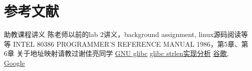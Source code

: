 \documentclass[11pt,a4paper]{article}
\begin{document}
\section{参考文献}
\begin{thebibliography}{10}
 助教课程讲义
 陈老师以前的lab 2讲义，background assignment, linux源码阅读等等
 INTEL 80386 PROGRAMMER'S REFERENCE MANUAL 1986，第5章、第6章
 关于地址映射请教过谢佳亮同学
 \href{http://man.chinaunix.net/linux/lfs/htmlbook/appendixa/glibc.html}{GNU glibc}
 \href{http://bigwhite.blogbus.com/logs/37753065.html}{glibc strlen实现分析}
 \href{http://g.cn}{谷歌}, \href{http://www.google.com/ncr}{Google}
\end{thebibliography}
\end{document}
